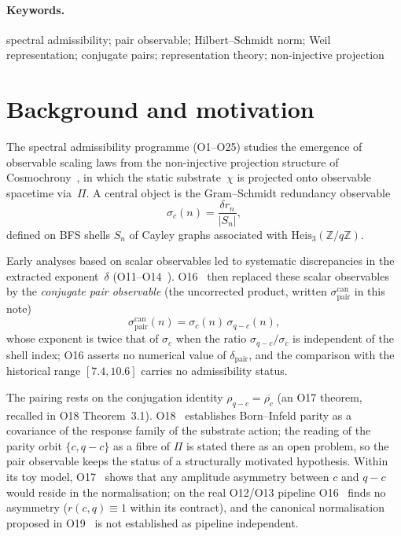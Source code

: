 \documentclass[12pt,a4paper]{article}
\theoremstyle{definition}
\theoremstyle{remark}
\begin{document}
  \paragraph{Keywords.}
    spectral admissibility; pair observable; Hilbert–Schmidt norm; Weil representation; conjugate
    pairs; representation theory; non-injective projection

    \clearpage
    \tableofcontents

    \clearpage
  \section{Background and motivation}
  \label{sec:background}

  The spectral admissibility programme (O1--O25) studies the emergence of observable
  scaling laws from the non-injective projection structure of Cosmochrony~\cite{Cosmochrony},
  in which the static substrate~$\chi$ is projected onto observable spacetime via~$\Pi$.
  A central object is the Gram--Schmidt redundancy observable
  \begin{equation}
    \sigma_c(n) = \frac{\delta r_n}{|S_n|},
  \end{equation}
  defined on BFS shells $S_n$ of Cayley graphs associated with
  $\mathrm{Heis}_3(\mathbb{Z}/q\mathbb{Z})$.

  Early analyses based on scalar observables led to systematic discrepancies in the
  extracted exponent~$\delta$ (O11--O14~\cite{Beau2026a15,Beau2026a16,Beau2026a17,Beau2026a18}).
  O16~\cite{Beau2026a20} then replaced these scalar observables by
  the \emph{conjugate pair observable} (the uncorrected product, written
  $\sigma^{\mathrm{can}}_{\mathrm{pair}}$ in this note)
  \begin{equation}
    \sigma^{\mathrm{can}}_{\mathrm{pair}}(n) = \sigma_c(n)\,\sigma_{q-c}(n),
  \end{equation}
  whose exponent is twice that of $\sigma_c$ when the ratio $\sigma_{q-c}/\sigma_c$ is
  independent of the shell index; O16 asserts no numerical value of $\delta_{\mathrm{pair}}$,
  and the comparison with the historical range $[7.4, 10.6]$ carries no admissibility status.

  The pairing rests on the conjugation identity
  $\rho_{q-c} = \overline{\rho_c}$ (an O17 theorem, recalled in O18 Theorem~3.1).
  O18~\cite{Beau2026a22} establishes Born--Infeld parity as a covariance of the response family
  of the substrate action; the reading of the parity orbit $\{c, q-c\}$ as a fibre
  of $\Pi$ is stated there as an open problem, so the pair observable keeps the
  status of a structurally motivated hypothesis.
  Within its toy model, O17~\cite{Beau2026a21} shows that any amplitude asymmetry between $c$ and
  $q-c$ would reside in the normalisation; on the real O12/O13 pipeline O16~\cite{Beau2026a20}
  finds no asymmetry ($r(c,q) \equiv 1$ within its contract), and the canonical normalisation
  proposed in O19~\cite{Beau2026a23} is not established as pipeline independent.
\end{document}
